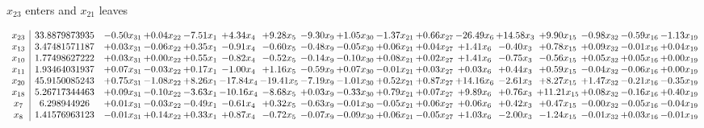 \documentclass[9pt]{article}
\begin{document}
 $ x_{23} $ enters and $ x_{21} $ leaves 

 \[\begin{array}{c| c c@{\hskip 2pt} c@{\hskip 2pt} c@{\hskip 2pt} c@{\hskip 2pt} c@{\hskip 2pt} c@{\hskip 2pt} c@{\hskip 2pt} c@{\hskip 2pt} c@{\hskip 2pt} c@{\hskip 2pt} c@{\hskip 2pt} c@{\hskip 2pt} c@{\hskip 2pt} c@{\hskip 2pt} c@{\hskip 2pt} }
 x_{23}   &  33.8879873935 & -0.50 x_{31} & +  0.04 x_{22} & -7.51 x_{1} & +  4.34 x_{4} & +  9.28 x_{5} & -9.30 x_{9} & +  1.05 x_{30} & -1.37 x_{21} & +  0.66 x_{27} & -26.49 x_{6} & + 14.58 x_{3} & +  9.90 x_{15} & -0.98 x_{32} & -0.59 x_{16} & -1.13 x_{19}\\
 x_{13}   &  3.47481571187 & +  0.03 x_{31} & -0.06 x_{22} & +  0.35 x_{1} & -0.91 x_{4} & -0.60 x_{5} & -0.48 x_{9} & -0.05 x_{30} & +  0.06 x_{21} & +  0.04 x_{27} & +  1.41 x_{6} & -0.40 x_{3} & +  0.78 x_{15} & +  0.09 x_{32} & -0.01 x_{16} & +  0.04 x_{19}\\
 x_{10}   &  1.77498627222 & +  0.03 x_{31} & +  0.00 x_{22} & +  0.55 x_{1} & -0.82 x_{4} & -0.52 x_{5} & -0.14 x_{9} & -0.10 x_{30} & +  0.08 x_{21} & +  0.02 x_{27} & +  1.41 x_{6} & -0.75 x_{3} & -0.56 x_{15} & +  0.05 x_{32} & +  0.05 x_{16} & +  0.00 x_{19}\\
 x_{11}   &  1.93464031937 & +  0.07 x_{31} & -0.03 x_{22} & +  0.17 x_{1} & -1.00 x_{4} & +  1.16 x_{5} & -0.59 x_{9} & +  0.07 x_{30} & -0.01 x_{21} & +  0.03 x_{27} & +  0.03 x_{6} & +  0.44 x_{3} & +  0.59 x_{15} & -0.04 x_{32} & -0.06 x_{16} & +  0.00 x_{19}\\
 x_{20}   &  45.9150085243 & +  0.75 x_{31} & -1.08 x_{22} & +  8.26 x_{1} & -17.84 x_{4} & -19.41 x_{5} & -7.19 x_{9} & -1.01 x_{30} & +  0.52 x_{21} & +  0.87 x_{27} & + 14.16 x_{6} & -2.61 x_{3} & +  8.27 x_{15} & +  1.47 x_{32} & -0.21 x_{16} & -0.35 x_{19}\\
 x_{18}   &  5.26717344463 & +  0.09 x_{31} & -0.10 x_{22} & -3.63 x_{1} & -10.16 x_{4} & -8.68 x_{5} & +  0.03 x_{9} & -0.33 x_{30} & +  0.79 x_{21} & +  0.07 x_{27} & +  9.89 x_{6} & +  0.76 x_{3} & + 11.21 x_{15} & +  0.08 x_{32} & -0.16 x_{16} & +  0.40 x_{19}\\
 x_{7}   &  6.298944926 & +  0.01 x_{31} & -0.03 x_{22} & -0.49 x_{1} & -0.61 x_{4} & +  0.32 x_{5} & -0.63 x_{9} & -0.01 x_{30} & -0.05 x_{21} & +  0.06 x_{27} & +  0.06 x_{6} & +  0.42 x_{3} & +  0.47 x_{15} & -0.00 x_{32} & -0.05 x_{16} & -0.04 x_{19}\\
 x_{8}   &  1.41576963123 & -0.01 x_{31} & +  0.14 x_{22} & +  0.33 x_{1} & +  0.87 x_{4} & -0.72 x_{5} & -0.07 x_{9} & -0.09 x_{30} & +  0.06 x_{21} & -0.05 x_{27} & +  1.03 x_{6} & -2.00 x_{3} & -1.24 x_{15} & -0.01 x_{32} & +  0.03 x_{16} & -0.01 x_{19}\\

\end{array}\]
\end{document}
